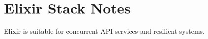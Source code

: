 \section{Elixir Stack Notes}

Elixir is suitable for concurrent API services and resilient systems.
